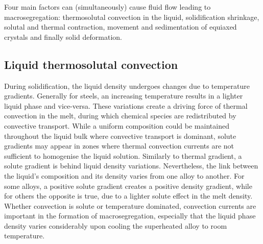 Four main factors can (simultaneously) cause fluid flow leading to macrosegregation:
thermosolutal convection in the liquid, solidification shrinkage, solutal and thermal contraction,
movement and sedimentation of equiaxed crystals and finally solid deformation.
%

\subsection{Liquid thermosolutal convection}
During solidification, the liquid density undergoes changes due to temperature gradients.
Generally for steels, an increasing temperature results in a lighter liquid phase and vice-versa.
These variations create a driving force of thermal convection in the melt, during which 
chemical species are redistributed by convective transport. While a uniform composition
could be maintained throughout the liquid bulk where convective transport is dominant, 
solute gradients may appear in zones where thermal convection currents are not sufficient to homogenise the liquid solution. 
Similarly to thermal gradient, a solute gradient is behind liquid density variations.
Nevertheless, the link between the liquid's composition and its density varies from one alloy to another. 
For some alloys, a positive solute gradient creates a positive density gradient, while
for others the opposite is true, due to a lighter solute effect in the melt density. Whether convection is solute or temperature
dominated, convection currents are important in the formation of macrosegregation, especially that the
liquid phase density varies considerably upon cooling the superheated alloy to room temperature.

